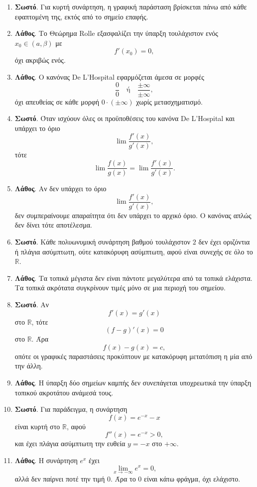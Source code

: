 \begin{enumerate}[label=\textbf{2.\arabic*.}]
\item \textbf{Σωστό}. Για κυρτή συνάρτηση, η γραφική παράσταση βρίσκεται πάνω από κάθε εφαπτομένη της, εκτός από το σημείο επαφής.

\item \textbf{Λάθος}. Το Θεώρημα Rolle εξασφαλίζει την ύπαρξη τουλάχιστον ενός $x_0\in(a,\beta)$ με
\[
f'(x_0)=0,
\]
όχι ακριβώς ενός.

\item \textbf{Λάθος}. Ο κανόνας De L'Hospital εφαρμόζεται άμεσα σε μορφές
\[
\frac{0}{0}
\quad\text{ή}\quad
\frac{\pm\infty}{\pm\infty},
\]
όχι απευθείας σε κάθε μορφή $0\cdot(\pm\infty)$ χωρίς μετασχηματισμό.

\item \textbf{Σωστό}. Όταν ισχύουν όλες οι προϋποθέσεις του κανόνα De L'Hospital και υπάρχει το όριο
\[
\lim \frac{f'(x)}{g'(x)},
\]
τότε
\[
\lim \frac{f(x)}{g(x)}=\lim \frac{f'(x)}{g'(x)}.
\]

\item \textbf{Λάθος}. Αν δεν υπάρχει το όριο
\[
\lim \frac{f'(x)}{g'(x)},
\]
δεν συμπεραίνουμε απαραίτητα ότι δεν υπάρχει το αρχικό όριο. Ο κανόνας απλώς δεν δίνει τότε αποτέλεσμα.

\item \textbf{Σωστό}. Κάθε πολυωνυμική συνάρτηση βαθμού τουλάχιστον $2$ δεν έχει οριζόντια ή πλάγια ασύμπτωτη, ούτε κατακόρυφη ασύμπτωτη, αφού είναι συνεχής σε όλο το $\mathbb{R}$.

\item \textbf{Λάθος}. Τα τοπικά μέγιστα δεν είναι πάντοτε μεγαλύτερα από τα τοπικά ελάχιστα. Τα τοπικά ακρότατα συγκρίνουν τιμές μόνο σε μια περιοχή του σημείου.

\item \textbf{Σωστό}. Αν
\[
f'(x)=g'(x)
\]
στο $\mathbb{R}$, τότε
\[
(f-g)'(x)=0
\]
στο $\mathbb{R}$. Άρα
\[
f(x)-g(x)=c,
\]
οπότε οι γραφικές παραστάσεις προκύπτουν με κατακόρυφη μετατόπιση η μία από την άλλη.

\item \textbf{Λάθος}. Η ύπαρξη δύο σημείων καμπής δεν συνεπάγεται υποχρεωτικά την ύπαρξη τοπικού ακροτάτου ανάμεσά τους.

\item \textbf{Σωστό}. Για παράδειγμα, η συνάρτηση
\[
f(x)=e^{-x}-x
\]
είναι κυρτή στο $\mathbb{R}$, αφού
\[
f''(x)=e^{-x}>0,
\]
και έχει πλάγια ασύμπτωτη την ευθεία $y=-x$ στο $+\infty$.

\item \textbf{Λάθος}. Η συνάρτηση $e^x$ έχει
\[
\lim_{x\to-\infty}e^x=0,
\]
αλλά δεν παίρνει ποτέ την τιμή $0$. Άρα το $0$ είναι κάτω φράγμα, όχι ελάχιστο.


\end{enumerate}
